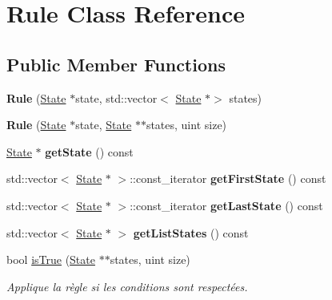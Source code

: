 \hypertarget{class_rule}{}\section{Rule Class Reference}
\label{class_rule}
\subsection*{Public Member Functions}
\begin{DoxyCompactItemize}
\item 
\mbox{\label{class_rule_a7759a5d0f1c93805e9001b4b09ee7926}} 
{\bfseries Rule} (\mbox{\hyperlink{class_state}{State}} $\ast$state, std\+::vector$<$ \mbox{\hyperlink{class_state}{State}} $\ast$$>$ states)
\item 
\mbox{\label{class_rule_a1ff6e04bbfb4f036d33cd0707f17d97f}} 
{\bfseries Rule} (\mbox{\hyperlink{class_state}{State}} $\ast$state, \mbox{\hyperlink{class_state}{State}} $\ast$$\ast$states, uint size)
\item 
\mbox{\label{class_rule_ad18f51e66244bb390f588319e0cc546a}} 
\mbox{\hyperlink{class_state}{State}} $\ast$ {\bfseries get\+State} () const
\item 
\mbox{\label{class_rule_abb94999ebf28e2840f62581c8216971b}} 
std\+::vector$<$ \mbox{\hyperlink{class_state}{State}} $\ast$ $>$\+::const\+\_\+iterator {\bfseries get\+First\+State} () const
\item 
\mbox{\label{class_rule_a62e85179b195fd7db9317d1aba46ccb0}} 
std\+::vector$<$ \mbox{\hyperlink{class_state}{State}} $\ast$ $>$\+::const\+\_\+iterator {\bfseries get\+Last\+State} () const
\item 
\mbox{\label{class_rule_a74b2decef119406fbb367347222ac3f4}} 
std\+::vector$<$ \mbox{\hyperlink{class_state}{State}} $\ast$ $>$ {\bfseries get\+List\+States} () const
\item 
bool \mbox{\hyperlink{class_rule_af2ee35d50c019724a8de58c1b65586ec}{is\+True}} (\mbox{\hyperlink{class_state}{State}} $\ast$$\ast$states, uint size)
\begin{DoxyCompactList}\small\item\em Applique la règle si les conditions sont respectées. \end{DoxyCompactList}\end{DoxyCompactItemize}



